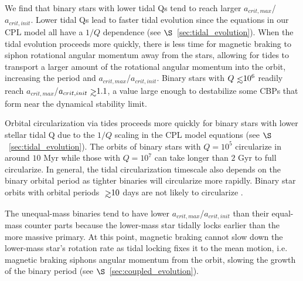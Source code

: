 We find that binary stars with lower tidal Qs tend to reach larger $a_{crit,max}$/$a_{crit,init}$.  Lower tidal Qs lead to faster tidal evolution since the equations in our CPL model all have a $1/Q$ dependence (see $\S$~\ref{sec:tidal_evolution}).  When the tidal evolution proceeds more quickly, there is less time for magnetic braking to siphon rotational angular momentum away from the stars, allowing for tides to transport a larger amount of the rotational angular momentum into the orbit, increasing the period and $a_{crit,max}$/$a_{crit,init}$.  Binary stars with $Q \lsim 10^6$ readily reach $a_{crit,max}$/$a_{crit,init} \gsim 1.1$, a value large enough to destabilize some CBPs that form near the dynamical stability limit.

Orbital circularization via tides proceeds more quickly for binary stars with lower stellar tidal Q due to the $1/Q$ scaling in the CPL model equations (see $\S$~\ref{sec:tidal_evolution}).  The orbits of binary stars with $Q = 10^5$ circularize in around $10$ Myr while those with $Q = 10^7$ can take longer than $2$ Gyr to full circularize.  In general, the tidal circularization timescale also depends on the binary orbital period as tighter binaries will circularize more rapidly.  Binary star orbits with orbital periods $\gsim 10$ days are not likely to circularize \citep[e.g.][]{Zahn1989,Meibom2005,Raghavan2010,Lurie2017}.

The unequal-mass binaries tend to have lower $a_{crit,max}$/$a_{crit,init}$ than their equal-mass counter parts because the lower-mass star tidally locks earlier than the more massive primary.  At this point, magnetic braking cannot slow down the lower-mass star's rotation rate as tidal locking fixes it to the mean motion, i.e. magnetic braking siphons angular momentum from the orbit, slowing the growth of the binary period (see $\S$~\ref{sec:coupled_evolution}).

